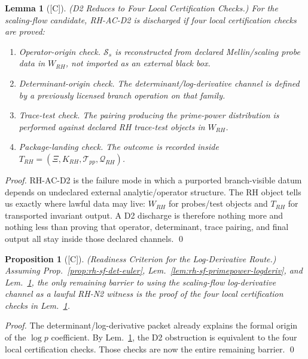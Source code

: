 \documentclass[12pt,oneside]{amsbook}
\theoremstyle{plain}
\newtheorem{lemma}[theorem]{Lemma}
\newtheorem{proposition}[theorem]{Proposition}
\theoremstyle{definition}
\theoremstyle{remark}
\newcommand{\status}[1]{\textup{[#1]}}
\begin{document}
\begin{lemma}[\status{C}]\label{lem:rh-d2-reduction}
\textup{(D2 Reduces to Four Local Certification Checks.)}
For the scaling-flow candidate, RH-AC-D2 is discharged if four local
certification checks are proved:
\begin{enumerate}[label=\textup{(\arabic*)}]
 \item \emph{Operator-origin check.} $\mathcal{S}_s$ is
 reconstructed from declared Mellin/scaling probe data in $W_{RH}$,
 not imported as an external black box.
 \item \emph{Determinant-origin check.} The
 determinant/log-derivative channel is defined by a previously
 licensed branch operation on that family.
 \item \emph{Trace-test check.} The pairing producing the
 prime-power distribution is performed against declared RH
 trace-test objects in $W_{RH}$.
 \item \emph{Package-landing check.} The outcome is recorded inside
 $T_{RH} = (\Xi, K_{RH}, \mathcal{T}_{pp}, \mathcal{Q}_{RH})$.
\end{enumerate}
\end{lemma}

\begin{proof}
RH-AC-D2 is the failure mode in which a purported branch-visible datum
depends on undeclared external analytic/operator structure. The RH
object tells us exactly where lawful data may live: $W_{RH}$ for
probes/test objects and $T_{RH}$ for transported invariant output.
A D2 discharge is therefore nothing more and nothing less than proving
that operator, determinant, trace pairing, and final output all stay
inside those declared channels. \qed
\end{proof}

\begin{proposition}[\status{C}]\label{prop:rh-sf-logderiv-d2-ready}
\textup{(Readiness Criterion for the Log-Derivative Route.)}
Assuming Prop.~\ref{prop:rh-sf-det-euler},
Lem.~\ref{lem:rh-sf-primepower-logderiv}, and
Lem.~\ref{lem:rh-d2-reduction}, the only remaining barrier to using
the scaling-flow log-derivative channel as a lawful RH-N2 witness is
the proof of the four local certification checks in
Lem.~\ref{lem:rh-d2-reduction}.
\end{proposition}

\begin{proof}
The determinant/log-derivative packet already explains the formal
origin of the $\log p$ coefficient. By Lem.~\ref{lem:rh-d2-reduction},
the D2 obstruction is equivalent to the four local certification checks.
Those checks are now the entire remaining barrier. \qed
\end{proof}
\end{document}
